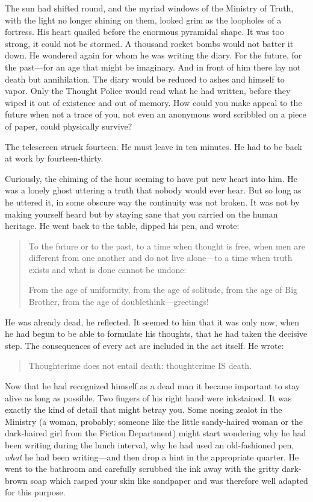 The sun had shifted round, and the myriad windows of the Ministry of
Truth, with the light no longer shining on them, looked grim as the
loopholes of a fortress. His heart quailed before the enormous pyramidal
shape. It was too strong, it could not be stormed. A thousand rocket
bombs would not batter it down. He wondered again for whom he was
writing the diary. For the future, for the past---for an age that might
be imaginary. And in front of him there lay not death but annihilation.
The diary would be reduced to ashes and himself to vapor. Only the
Thought Police would read what he had written, before they wiped it out
of existence and out of memory. How could you make appeal to the future
when not a trace of you, not even an anonymous word scribbled on a piece
of paper, could physically survive?

The telescreen struck fourteen. He must leave in ten minutes. He had to
be back at work by fourteen-thirty.

Curiously, the chiming of the hour seeming to have put new heart into
him. He was a lonely ghost uttering a truth that nobody would ever hear.
But so long as he uttered it, in some obscure way the continuity was not
broken. It was not by making yourself heard but by staying sane that you
carried on the human heritage. He went back to the table, dipped his
pen, and wrote:

\begin{quotation}
To the future or to the past, to a time when thought is free, when
men are different from one another and do not live alone---to a time
when truth exists and what is done cannot be undone:

From the age of uniformity, from the age of solitude, from the age
of Big Brother, from the age of doublethink---greetings!
\end{quotation}

He was already dead, he reflected. It seemed to him that it was only
now, when he had begun to be able to formulate his thoughts, that he had
taken the decisive step. The consequences of every act are included in
the act itself. He wrote:

\begin{quotation}
Thoughtcrime does not entail death: thoughtcrime IS death.
\end{quotation}

Now that he had recognized himself as a dead man it became important to
stay alive as long as possible. Two fingers of his right hand were
inkstained. It was exactly the kind of detail that might betray you.
Some nosing zealot in the Ministry (a woman, probably; someone like the
little sandy-haired woman or the dark-haired girl from the Fiction
Department) might start wondering why he had been writing during the
lunch interval, why he had used an old-fashioned pen, \emph{what} he had
been writing---and then drop a hint in the appropriate quarter. He went
to the bathroom and carefully scrubbed the ink away with the gritty
dark-brown soap which rasped your skin like sandpaper and was therefore
well adapted for this purpose.

